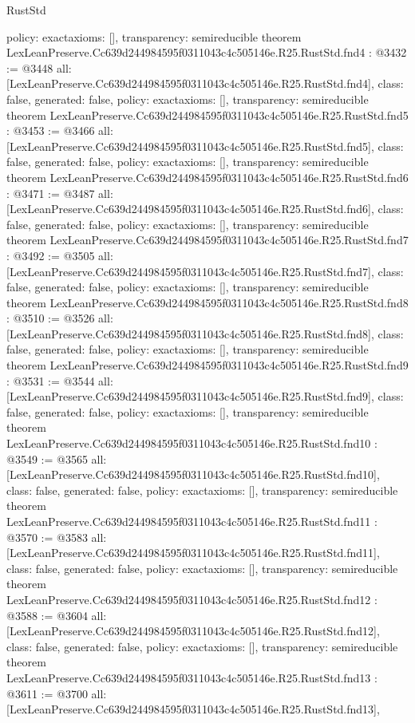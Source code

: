 \begin{lexlean}{RustStd}
\begin{coremodule}
{  policy: exact{axioms: []},
  transparency: semireducible
}
theorem LexLeanPreserve.Cc639d244984595f0311043c4c505146e.R25.RustStd.fnd4 : @3432 := @3448 {
  all: [LexLeanPreserve.Cc639d244984595f0311043c4c505146e.R25.RustStd.fnd4],
  class: false,
  generated: false,
  policy: exact{axioms: []},
  transparency: semireducible
}
theorem LexLeanPreserve.Cc639d244984595f0311043c4c505146e.R25.RustStd.fnd5 : @3453 := @3466 {
  all: [LexLeanPreserve.Cc639d244984595f0311043c4c505146e.R25.RustStd.fnd5],
  class: false,
  generated: false,
  policy: exact{axioms: []},
  transparency: semireducible
}
theorem LexLeanPreserve.Cc639d244984595f0311043c4c505146e.R25.RustStd.fnd6 : @3471 := @3487 {
  all: [LexLeanPreserve.Cc639d244984595f0311043c4c505146e.R25.RustStd.fnd6],
  class: false,
  generated: false,
  policy: exact{axioms: []},
  transparency: semireducible
}
theorem LexLeanPreserve.Cc639d244984595f0311043c4c505146e.R25.RustStd.fnd7 : @3492 := @3505 {
  all: [LexLeanPreserve.Cc639d244984595f0311043c4c505146e.R25.RustStd.fnd7],
  class: false,
  generated: false,
  policy: exact{axioms: []},
  transparency: semireducible
}
theorem LexLeanPreserve.Cc639d244984595f0311043c4c505146e.R25.RustStd.fnd8 : @3510 := @3526 {
  all: [LexLeanPreserve.Cc639d244984595f0311043c4c505146e.R25.RustStd.fnd8],
  class: false,
  generated: false,
  policy: exact{axioms: []},
  transparency: semireducible
}
theorem LexLeanPreserve.Cc639d244984595f0311043c4c505146e.R25.RustStd.fnd9 : @3531 := @3544 {
  all: [LexLeanPreserve.Cc639d244984595f0311043c4c505146e.R25.RustStd.fnd9],
  class: false,
  generated: false,
  policy: exact{axioms: []},
  transparency: semireducible
}
theorem LexLeanPreserve.Cc639d244984595f0311043c4c505146e.R25.RustStd.fnd10 : @3549 := @3565 {
  all: [LexLeanPreserve.Cc639d244984595f0311043c4c505146e.R25.RustStd.fnd10],
  class: false,
  generated: false,
  policy: exact{axioms: []},
  transparency: semireducible
}
theorem LexLeanPreserve.Cc639d244984595f0311043c4c505146e.R25.RustStd.fnd11 : @3570 := @3583 {
  all: [LexLeanPreserve.Cc639d244984595f0311043c4c505146e.R25.RustStd.fnd11],
  class: false,
  generated: false,
  policy: exact{axioms: []},
  transparency: semireducible
}
theorem LexLeanPreserve.Cc639d244984595f0311043c4c505146e.R25.RustStd.fnd12 : @3588 := @3604 {
  all: [LexLeanPreserve.Cc639d244984595f0311043c4c505146e.R25.RustStd.fnd12],
  class: false,
  generated: false,
  policy: exact{axioms: []},
  transparency: semireducible
}
theorem LexLeanPreserve.Cc639d244984595f0311043c4c505146e.R25.RustStd.fnd13 : @3611 := @3700 {
  all: [LexLeanPreserve.Cc639d244984595f0311043c4c505146e.R25.RustStd.fnd13],
}
\end{coremodule}
\end{lexlean}
